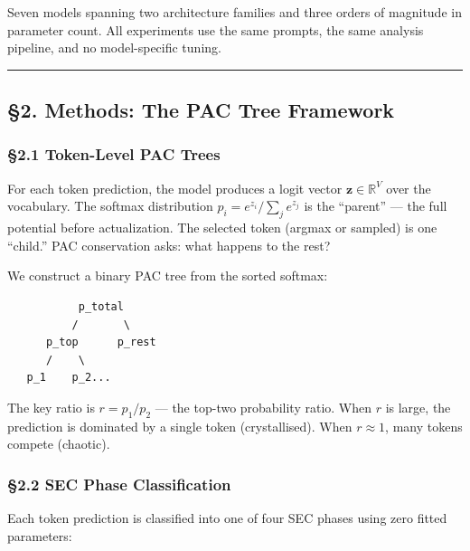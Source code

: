 \documentclass[
  11pt,
  a4paper]{article}
\begin{document}
Seven models spanning two architecture families and three orders of
magnitude in parameter count. All experiments use the same prompts, the
same analysis pipeline, and no model-specific tuning.

\begin{center}\rule{0.5\linewidth}{0.5pt}\end{center}

\subsection{§2. Methods: The PAC Tree
Framework}\label{methods-the-pac-tree-framework}

\subsubsection{§2.1 Token-Level PAC Trees}\label{token-level-pac-trees}

For each token prediction, the model produces a logit vector
\(\mathbf{z} \in \mathbb{R}^V\) over the vocabulary. The softmax
distribution \(p_i = e^{z_i}/\sum_j e^{z_j}\) is the ``parent'' --- the
full potential before actualization. The selected token (argmax or
sampled) is one ``child.'' PAC conservation asks: what happens to the
rest?

We construct a binary PAC tree from the sorted softmax:

\begin{verbatim}
           p_total
          /       \
      p_top      p_rest
      /    \
   p_1    p_2...
\end{verbatim}

The key ratio is \(r = p_1 / p_2\) --- the top-two probability ratio.
When \(r\) is large, the prediction is dominated by a single token
(crystallised). When \(r \approx 1\), many tokens compete (chaotic).

\subsubsection{§2.2 SEC Phase
Classification}\label{sec-phase-classification}

Each token prediction is classified into one of four SEC phases using
zero fitted parameters:
\end{document}
